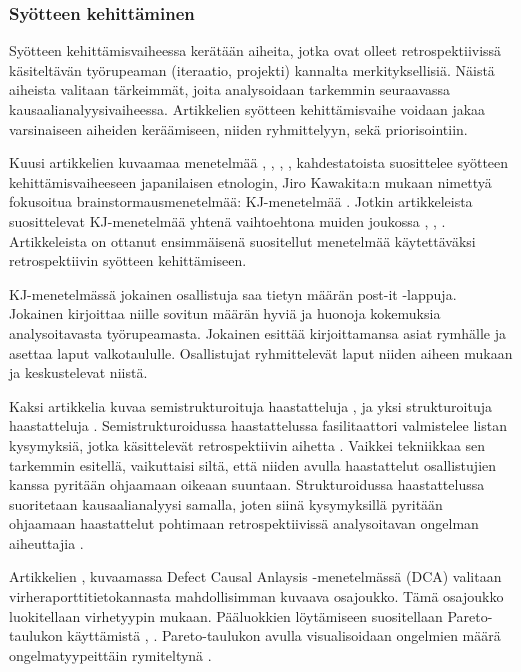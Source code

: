 \subsubsection{Syötteen kehittäminen}
Syötteen kehittämisvaiheessa kerätään aiheita, jotka ovat olleet retrospektiivissä käsiteltävän työrupeaman (iteraatio, projekti) kannalta merkityksellisiä. Näistä aiheista valitaan tärkeimmät, joita analysoidaan tarkemmin seuraavassa kausaalianalyysivaiheessa. Artikkelien syötteen kehittämisvaihe voidaan jakaa varsinaiseen aiheiden keräämiseen, niiden ryhmittelyyn, sekä priorisointiin.

Kuusi artikkelien kuvaamaa menetelmää \citep{birk2002postmortem}, \citep{dingsoyr2003extending}, \citep{staalhane2003post}, \citep{de2004learning}, \citep{Bjornson2009} kahdestatoista suosittelee syötteen kehittämisvaiheeseen japanilaisen etnologin, Jiro Kawakita:n mukaan nimettyä fokusoitua brainstormausmenetelmää: KJ-menetelmää \citep{dingsoyr2003extending}. Jotkin artikkeleista suosittelevat KJ-menetelmää yhtenä vaihtoehtona muiden joukossa \citep{birk2002postmortem}, \citep{staalhane2003post}, \citep{de2004learning}. Artikkeleista \citep{birk2002postmortem} on ottanut ensimmäisenä suositellut menetelmää käytettäväksi retrospektiivin syötteen kehittämiseen.

KJ-menetelmässä jokainen osallistuja saa tietyn määrän post-it -lappuja. Jokainen kirjoittaa niille sovitun määrän hyviä ja huonoja kokemuksia analysoitavasta työrupeamasta. Jokainen esittää kirjoittamansa asiat rymhälle ja asettaa laput valkotaululle. Osallistujat ryhmittelevät laput niiden aiheen mukaan ja keskustelevat niistä. \citep{birk2002postmortem}

Kaksi artikkelia kuvaa semistrukturoituja haastatteluja \citep{birk2002postmortem}, \citep{de2004learning} ja yksi strukturoituja haastatteluja \citep{staalhane2003post}. Semistrukturoidussa haastattelussa fasilitaattori valmistelee listan kysymyksiä, jotka käsittelevät retrospektiivin aihetta \citep{birk2002postmortem}. Vaikkei tekniikkaa sen tarkemmin esitellä, vaikuttaisi siltä, että niiden avulla haastattelut osallistujien kanssa pyritään ohjaamaan oikeaan suuntaan. Strukturoidussa haastattelussa suoritetaan kausaalianalyysi samalla, joten siinä kysymyksillä pyritään ohjaamaan haastattelut pohtimaan retrospektiivissä analysoitavan ongelman aiheuttajia \citep{staalhane2003post}.

Artikkelien \citep{kalinowski2012evidence}, \citep{card1998learning} kuvaamassa Defect Causal Anlaysis -menetelmässä (DCA) valitaan virheraporttitietokannasta mahdollisimman kuvaava osajoukko. Tämä osajoukko luokitellaan virhetyypin mukaan. Pääluokkien löytämiseen suositellaan Pareto-taulukon käyttämistä \citep{kalinowski2012evidence}, \citep{card1998learning}. Pareto-taulukon avulla visualisoidaan ongelmien määrä ongelmatyypeittäin rymiteltynä \citep{card1998learning}.

